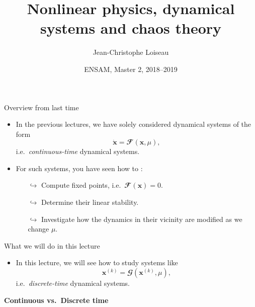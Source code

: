 \documentclass[usenames,dvipsnames,svgnames,10pt,aspectratio=169]{beamer}
\title[Nonlinear Physics] %
{
	Nonlinear physics, dynamical \\ systems and chaos theory
}
\author[J.-Ch.~Loiseau] %
{
	Jean-Christophe Loiseau
}
\institute[unused]
{
	\url{jean-christophe.loiseau@ensam.eu} \\
	DynFluid, \\
	Arts et M\'etiers ParisTech, France
}
\date[unused]{ENSAM, Master 2, 2018--2019}
\begin{document}
\titleframe %


\begin{frame}[t, c]{Overview from last time}{}
	\begin{itemize}
		\item In the previous lectures, we have solely considered dynamical systems of the form
		$$\dot{\mathbf{x}} = \mathbfcal{F}\left( \mathbf{x}, \mu \right),$$
		i.e.\ \emph{continuous-time} dynamical systems.

		\bigskip

		\item For such systems, you have seen how to :
		\begin{itemize}
			\item[$\hookrightarrow$] Compute fixed points, i.e.\ $\mathbfcal{F}\left( \mathbf{x} \right) = 0$.
			\item[$\hookrightarrow$] Determine their linear stability.
			\item[$\hookrightarrow$] Investigate how the dynamics in their vicinity are modified as we change $\mu$.
		\end{itemize}
	\end{itemize}

	\vspace{1cm}
\end{frame}

\begin{frame}[t, c]{What we will do in this lecture}{}
	\begin{itemize}
		\item In this lecture, we will see how to study systems like
		$$\mathbf{x}^{(k)} = \mathbfcal{G}\left( \mathbf{x}^{(k)}, \mu \right),$$
		i.e.\ \emph{discrete-time} dynamical systems.
	\end{itemize}

	\vspace{1cm}
\end{frame}

\begin{frame}[t, c]{}
	\centering
	\vspace{1cm}

	{\Large \textbf{Continuous vs.\ Discrete time}}

	\bigskip

	{}

\end{frame}
\end{document}
